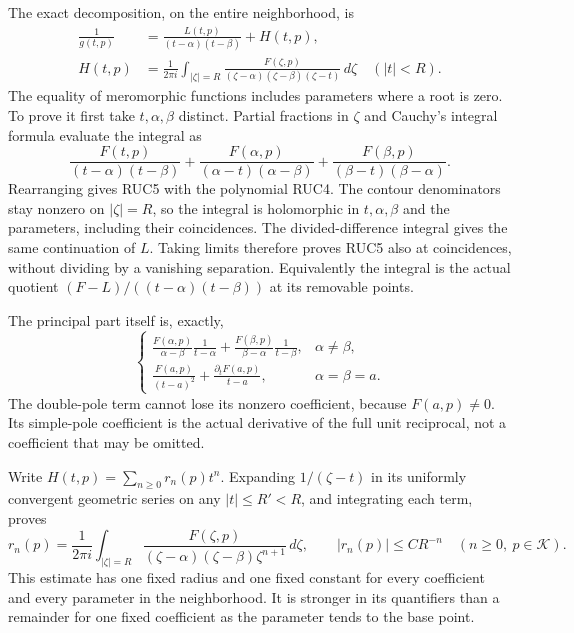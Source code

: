 The exact decomposition, on the entire neighborhood, is
\[
 \begin{aligned}
 \frac1{g(t,p)}&=\frac{L(t,p)}{(t-\alpha)(t-\beta)}+H(t,p),\\
 H(t,p)&=\frac1{2\pi i}\int_{|\zeta|=R}
 \frac{F(\zeta,p)}{(\zeta-\alpha)(\zeta-\beta)(\zeta-t)}\,d\zeta
                    \quad(|t|<R).
 \end{aligned}\tag{RUC5}
\]
The equality of meromorphic functions includes parameters where a
root is zero.  To prove it first take $t,\alpha,\beta$ distinct.
Partial fractions in $\zeta$ and Cauchy's integral formula evaluate
the integral as
\[
 \frac{F(t,p)}{(t-\alpha)(t-\beta)}
 +\frac{F(\alpha,p)}{(\alpha-t)(\alpha-\beta)}
 +\frac{F(\beta,p)}{(\beta-t)(\beta-\alpha)}.
\]
Rearranging gives RUC5 with the polynomial RUC4.  The contour
denominators stay nonzero on $|\zeta|=R$, so the integral is
holomorphic in $t,\alpha,\beta$ and the parameters, including
their coincidences.  The divided-difference integral gives the
same continuation of $L$.  Taking limits therefore proves RUC5
also at coincidences, without dividing by a vanishing separation.
Equivalently the integral is the actual quotient
$(F-L)/((t-\alpha)(t-\beta))$ at its removable points.

The principal part itself is, exactly,
\[
 \begin{cases}
 \displaystyle
 \frac{F(\alpha,p)}{\alpha-\beta}\frac1{t-\alpha}
 +\frac{F(\beta,p)}{\beta-\alpha}\frac1{t-\beta},&\alpha\ne\beta,\\[6pt]
 \displaystyle \frac{F(a,p)}{(t-a)^2}
              +\frac{\partial_tF(a,p)}{t-a},&\alpha=\beta=a.
 \end{cases}\tag{RUC6}
\]
The double-pole term cannot lose its nonzero coefficient, because
$F(a,p)\ne0$.  Its simple-pole coefficient is the actual derivative
of the full unit reciprocal, not a coefficient that may be omitted.

Write $H(t,p)=\sum_{n\ge0}r_n(p)t^n$.
Expanding $1/(\zeta-t)$ in its uniformly convergent geometric
series on any $|t|\le R'<R$, and integrating each term, proves
\[
 r_n(p)=\frac1{2\pi i}\int_{|\zeta|=R}
     \frac{F(\zeta,p)}{(\zeta-\alpha)(\zeta-\beta)\zeta^{n+1}}\,d\zeta,
 \qquad |r_n(p)|\le C R^{-n}\quad(n\ge0,\ p\in\mathcal K).
 \tag{RUC7}
\]
This estimate has one fixed radius and one fixed constant for
every coefficient and every parameter in the neighborhood.
It is stronger in its quantifiers than a remainder for one fixed
coefficient as the parameter tends to the base point.

